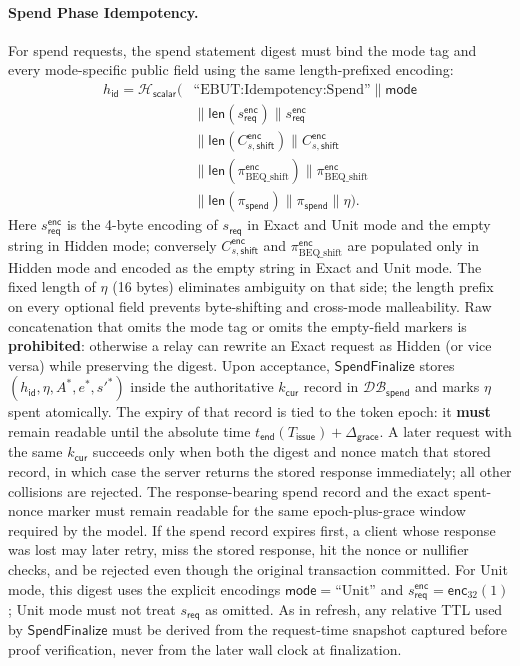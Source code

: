\documentclass[11pt]{article}
\theoremstyle{definitionstyle}
\theoremstyle{plain}
\newcommand{\DB}{\mathcal{DB}}
\begin{document}
\paragraph{Spend Phase Idempotency.}
For spend requests, the spend statement digest must bind the mode tag and every mode-specific public field using the same length-prefixed encoding:
\[
\begin{aligned}
h_{\mathsf{id}} = \mathcal{H}_{\mathsf{scalar}}\!\bigl(&\text{``EBUT:Idempotency:Spend''} \parallel \mathsf{mode} \\
&\parallel \mathsf{len}(s_{\mathsf{req}}^{\mathsf{enc}}) \parallel s_{\mathsf{req}}^{\mathsf{enc}} \\
&\parallel \mathsf{len}(C_{s,\mathsf{shift}}^{\mathsf{enc}}) \parallel C_{s,\mathsf{shift}}^{\mathsf{enc}} \\
&\parallel \mathsf{len}(\pi_{\text{BEQ\_shift}}^{\mathsf{enc}}) \parallel \pi_{\text{BEQ\_shift}}^{\mathsf{enc}} \\
&\parallel \mathsf{len}(\pi_{\mathsf{spend}}) \parallel \pi_{\mathsf{spend}} \parallel \eta \bigr).
\end{aligned}
\]
Here $s_{\mathsf{req}}^{\mathsf{enc}}$ is the 4-byte encoding of $s_{\mathsf{req}}$ in Exact and Unit mode and the empty string in Hidden mode; conversely $C_{s,\mathsf{shift}}^{\mathsf{enc}}$ and $\pi_{\text{BEQ\_shift}}^{\mathsf{enc}}$ are populated only in Hidden mode and encoded as the empty string in Exact and Unit mode. The fixed length of $\eta$ (16 bytes) eliminates ambiguity on that side; the length prefix on every optional field prevents byte-shifting and cross-mode malleability. Raw concatenation that omits the mode tag or omits the empty-field markers is \textbf{prohibited}: otherwise a relay can rewrite an Exact request as Hidden (or vice versa) while preserving the digest. Upon acceptance, $\mathsf{SpendFinalize}$ stores $(h_{\mathsf{id}}, \eta, A^*, e^*, s'^*)$ inside the authoritative $k_{\mathsf{cur}}$ record in $\DB_{\mathsf{spend}}$ and marks $\eta$ spent atomically. The expiry of that record is tied to the token epoch: it \textbf{must} remain readable until the absolute time $t_{\mathsf{end}}(T_{\mathsf{issue}})+\Delta_{\mathsf{grace}}$. A later request with the same $k_{\mathsf{cur}}$ succeeds only when both the digest and nonce match that stored record, in which case the server returns the stored response immediately; all other collisions are rejected. The response-bearing spend record and the exact spent-nonce marker must remain readable for the same epoch-plus-grace window required by the model. If the spend record expires first, a client whose response was lost may later retry, miss the stored response, hit the nonce or nullifier checks, and be rejected even though the original transaction committed.
For Unit mode, this digest uses the explicit encodings $\mathsf{mode}=\text{``Unit''}$ and $s_{\mathsf{req}}^{\mathsf{enc}} = \mathsf{enc}_{32}(1)$; Unit mode must not treat $s_{\mathsf{req}}$ as omitted. As in refresh, any relative TTL used by $\mathsf{SpendFinalize}$ must be derived from the request-time snapshot captured before proof verification, never from the later wall clock at finalization.
\end{document}

